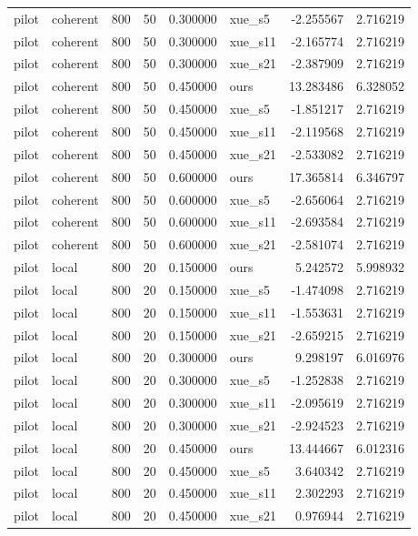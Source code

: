 \begin{longtable}{llrrrlrr}
pilot & coherent & 800 & 50 & 0.300000 & xue\_s5 & -2.255567 & 2.716219 \\
pilot & coherent & 800 & 50 & 0.300000 & xue\_s11 & -2.165774 & 2.716219 \\
pilot & coherent & 800 & 50 & 0.300000 & xue\_s21 & -2.387909 & 2.716219 \\
pilot & coherent & 800 & 50 & 0.450000 & ours & 13.283486 & 6.328052 \\
pilot & coherent & 800 & 50 & 0.450000 & xue\_s5 & -1.851217 & 2.716219 \\
pilot & coherent & 800 & 50 & 0.450000 & xue\_s11 & -2.119568 & 2.716219 \\
pilot & coherent & 800 & 50 & 0.450000 & xue\_s21 & -2.533082 & 2.716219 \\
pilot & coherent & 800 & 50 & 0.600000 & ours & 17.365814 & 6.346797 \\
pilot & coherent & 800 & 50 & 0.600000 & xue\_s5 & -2.656064 & 2.716219 \\
pilot & coherent & 800 & 50 & 0.600000 & xue\_s11 & -2.693584 & 2.716219 \\
pilot & coherent & 800 & 50 & 0.600000 & xue\_s21 & -2.581074 & 2.716219 \\
pilot & local & 800 & 20 & 0.150000 & ours & 5.242572 & 5.998932 \\
pilot & local & 800 & 20 & 0.150000 & xue\_s5 & -1.474098 & 2.716219 \\
pilot & local & 800 & 20 & 0.150000 & xue\_s11 & -1.553631 & 2.716219 \\
pilot & local & 800 & 20 & 0.150000 & xue\_s21 & -2.659215 & 2.716219 \\
pilot & local & 800 & 20 & 0.300000 & ours & 9.298197 & 6.016976 \\
pilot & local & 800 & 20 & 0.300000 & xue\_s5 & -1.252838 & 2.716219 \\
pilot & local & 800 & 20 & 0.300000 & xue\_s11 & -2.095619 & 2.716219 \\
pilot & local & 800 & 20 & 0.300000 & xue\_s21 & -2.924523 & 2.716219 \\
pilot & local & 800 & 20 & 0.450000 & ours & 13.444667 & 6.012316 \\
pilot & local & 800 & 20 & 0.450000 & xue\_s5 & 3.640342 & 2.716219 \\
pilot & local & 800 & 20 & 0.450000 & xue\_s11 & 2.302293 & 2.716219 \\
pilot & local & 800 & 20 & 0.450000 & xue\_s21 & 0.976944 & 2.716219 \\

\end{longtable}
